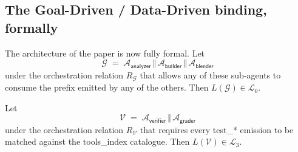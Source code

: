 \begin{table}[ht]
\centering
\caption{Structural Chomsky classification of the empirical sub-agents in
\texttt{experiment\_6/trace\_language.csv}.}
\label{tab:chomsky-empirical}
\begin{center}
\end{center}
\end{table}

\subsection{The Goal-Driven / Data-Driven binding, formally}

The architecture of the paper is now fully formal.  Let
\[
\mathcal{G} \;=\; \mathcal{A}_{\textsf{analyzer}}
            \,\Vert\, \mathcal{A}_{\textsf{builder}}
            \,\Vert\, \mathcal{A}_{\textsf{blender}}
\]
under the orchestration relation $R_\mathcal{G}$ that allows any
of these sub-agents to consume the prefix emitted by any of the
others.  Then $L(\mathcal{G}) \in \mathcal{L}_0$.

Let
\[
\mathcal{V} \;=\; \mathcal{A}_{\textsf{verifier}}
            \,\Vert\, \mathcal{A}_{\textsf{grader}}
\]
under the orchestration relation $R_\mathcal{V}$ that requires
every \textsf{test\_*} emission to be matched against the
\textsf{tools\_index} catalogue.  Then $L(\mathcal{V}) \in
\mathcal{L}_3$.


